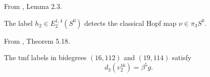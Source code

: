\begin{theorem}
\label{frontier:Literature:64496b8f7295}
From \cite{Adams58}, Lemma 2.3.\par

The label $h_2\in E_2^{1,4}(S^0)$ detects the classical Hopf map $\nu\in\pi_3S^0$.
\end{theorem}

\begin{theorem}
\label{frontier:Literature:6c63a4b40657}
From \cite{BR21}, Theorem 5.18.\par

The tmf labels in bidegrees $(16,112)$ and $(19,114)$ satisfy\[d_3(v_2^{16})=\beta^5g.\]
\end{theorem}

